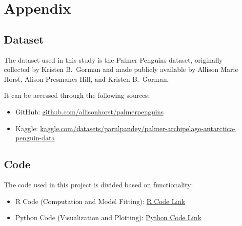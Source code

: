 \documentclass[12pt]{article}
\begin{document}
  \appendix
  \section{Appendix}

  \subsection{Dataset}

  The dataset used in this study is the
  Palmer Penguins dataset\cite{palmerpenguins},
  originally collected by Kristen B.\ Gorman and made publicly
  available by Allison Marie Horst, Alison Presmanes Hill, and
  Kristen B.\ Gorman.

  It can be accessed through the following sources:
  \begin{itemize}
      \item GitHub:
      \href{https://github.com/allisonhorst/palmerpenguins}
      {github.com/allisonhorst/palmerpenguins}

      \item Kaggle:
      \href{https://www.kaggle.com/datasets/parulpandey/palmer-archipelago-antarctica-penguin-data}
      {kaggle.com/datasets/parulpandey/palmer-archipelago-antarctica-penguin-data}
  \end{itemize}

  \subsection{Code}

  The code used in this project is divided based on functionality:
  \begin{itemize}
      \item R Code (Computation and Model Fitting):
      \href{https://github.com/Bubu-Droid/mini-projects-repo/tree/main/lin-reg-sem-2/codes/r-codes}
      {R Code Link}

      \item Python Code (Visualization and Plotting):
      \href{https://github.com/Bubu-Droid/mini-projects-repo/tree/main/lin-reg-sem-2/codes/plots}
      {Python Code Link}
  \end{itemize}

  
  
\end{document}
